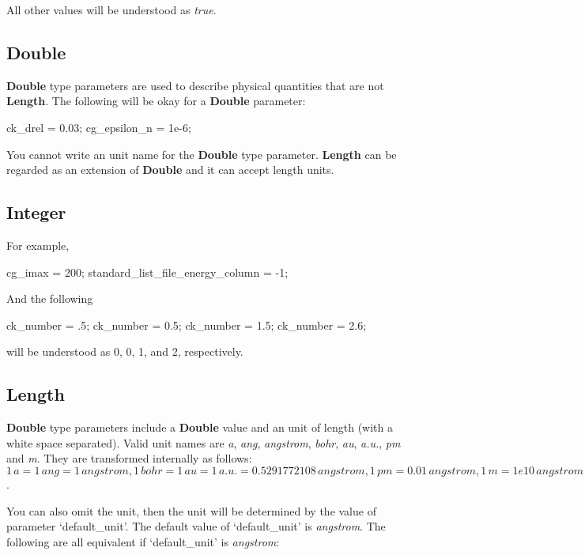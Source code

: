 \documentclass[11pt]{book}
\begin{document}
All other values will be understood as \emph{true}.

\subsection{Double}

\textbf{Double} type parameters are used to describe physical quantities that are not \textbf{Length}. The following will be okay
for a \textbf{Double} parameter:

\begin{everbatim}
ck_drel = 0.03;
cg_epsilon_n = 1e-6;
\end{everbatim}

You cannot write an unit name for the \textbf{Double} type parameter. \textbf{Length} can be regarded as an extension of 
\textbf{Double} and it can accept length units.

\subsection{Integer}

For example,

\begin{everbatim}
cg_imax = 200;
standard_list_file_energy_column = -1;
\end{everbatim}

And the following

\begin{everbatim}
ck_number = .5;
ck_number = 0.5;
ck_number = 1.5;
ck_number = 2.6;
\end{everbatim}

will be understood as 0, 0, 1, and 2, respectively.

\subsection{Length}

\textbf{Double} type parameters include a \textbf{Double} value and an unit of length (with a white space separated). 
Valid unit names are \emph{a}, \emph{ang}, \emph{angstrom}, \emph{bohr}, \emph{au}, \emph{a.u.}, \emph{pm} and \emph{m}. 
They are transformed internally as follows: $ 1\, a = 1\, ang = 1\, angstrom, 1\, bohr = 1\, au = 1\, a.u. = 0.5291772108\, angstrom, 
1\, pm = 0.01\, angstrom, 1\, m = 1e10\, angstrom $.

You can also omit the unit, then the unit will be determined by the value of parameter `default\_unit'. The default value of 
`default\_unit' is \emph{angstrom}. The following are all equivalent if `default\_unit' is \emph{angstrom}:
\end{document}
